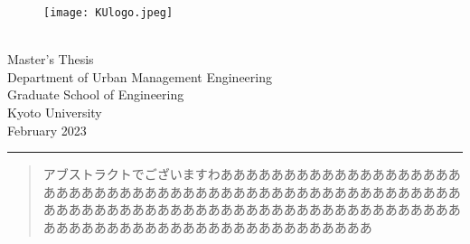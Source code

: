 \documentclass[11pt,a4paper,uplatex,onecolumn,dvipdfmx]{jsreport}
\begin{document}


\begin{titlepage}
    \vspace{15mm}
    \begin{wrapfigure}{r}{0.45\linewidth}  %
        \centering
        \vspace{5mm}\hspace{25mm}
        \texttt{[image: KUlogo.jpeg]}
    \end{wrapfigure}
    \leavevmode
    \par
    {
    \fontsize{12truept}{12truept}\selectfont
    \\
    Master's Thesis\\
    Department of Urban Management Engineering\\
    Graduate School of Engineering\\
    Kyoto University\\
    February 2023\\
    }
    \hrule
    \vspace{25mm}
    {
    \fontsize{16truept}{36truept}\selectfont
    }
\end{titlepage}


\begin{abstract}
    アブストラクトでございますわあああああああああああああああああああああああああああああああああああああああああああああああああああああああああああああああああああああああああああああああああああああああああああああああああああああああああああああああ
\end{abstract}
\end{document}
